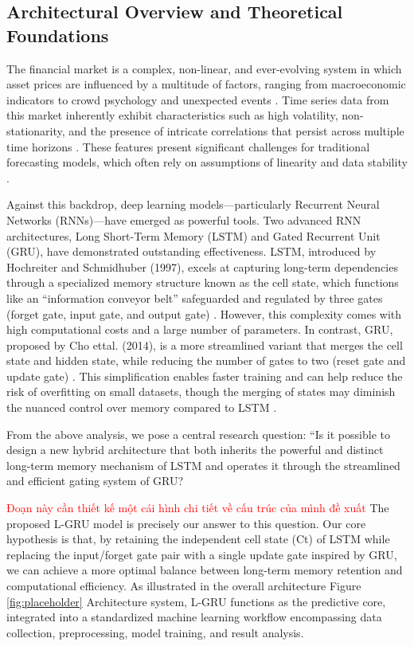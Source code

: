 \documentclass{cys}
\begin{document}
\subsection{Architectural Overview and Theoretical Foundations}
The financial market is a complex, non-linear, and ever-evolving system in which asset prices are influenced by a multitude of factors, ranging from macroeconomic indicators to crowd psychology and unexpected events \cite{akinrinola2024predicting}. Time series data from this market inherently exhibit characteristics such as high volatility, non-stationarity, and the presence of intricate correlations that persist across multiple time horizons \cite{refenes1994stock}. These features present significant challenges for traditional forecasting models, which often rely on assumptions of linearity and data stability \cite{makridakis2000m3}.

Against this backdrop, deep learning models—particularly Recurrent Neural Networks (RNNs)—have emerged as powerful tools. Two advanced RNN architectures, Long Short-Term Memory (LSTM) and Gated Recurrent Unit (GRU), have demonstrated outstanding effectiveness. LSTM, introduced by Hochreiter and Schmidhuber (1997), excels at capturing long-term dependencies through a specialized memory structure known as the cell state, which functions like an “information conveyor belt” safeguarded and regulated by three gates (forget gate, input gate, and output gate) \cite{hochreiter1997long}. However, this complexity comes with high computational costs and a large number of parameters. In contrast, GRU, proposed by Cho ettal. (2014), is a more streamlined variant that merges the cell state and hidden state, while reducing the number of gates to two (reset gate and update gate) \cite{cho2014learning}. This simplification enables faster training and can help reduce the risk of overfitting on small datasets, though the merging of states may diminish the nuanced control over memory compared to LSTM \cite{chung2014empirical}.

From the above analysis, we pose a central research question: “Is it possible to design a new hybrid architecture that both inherits the powerful and distinct long-term memory mechanism of LSTM and operates it through the streamlined and efficient gating system of GRU?

\textcolor{red}{Đoạn này cần thiết kế một cái hình chi tiết về cấu trúc của mình đề xuất} The proposed L-GRU model is precisely our answer to this question. Our core hypothesis is that, by retaining the independent cell state (Ct) of LSTM while replacing the input/forget gate pair with a single update gate inspired by GRU, we can achieve a more optimal balance between long-term memory retention and computational efficiency. As illustrated in the overall architecture Figure \ref{fig:placeholder} Architecture system, L-GRU functions as the predictive core, integrated into a standardized machine learning workflow encompassing data collection, preprocessing, model training, and result analysis.
\end{document}
